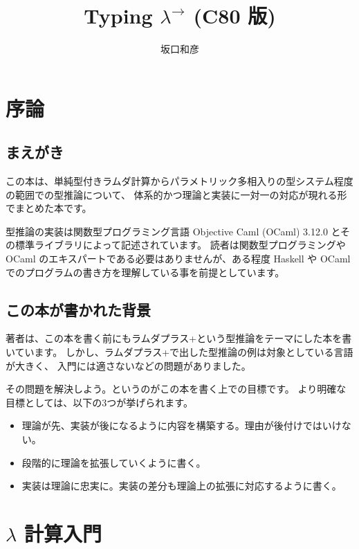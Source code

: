 \documentclass[b5paper]{jsbook}
\title{Typing $\lambda^\to$ (C80 版)}
\author{坂口和彦}
\begin{document}
\maketitle

\tableofcontents
\newpage
{}

\chapter{序論}

\section{まえがき}

この本は、単純型付きラムダ計算からパラメトリック多相入りの型システム程度の範囲での型推論について、
体系的かつ理論と実装に一対一の対応が現れる形でまとめた本です。

型推論の実装は関数型プログラミング言語 Objective Caml (OCaml) 3.12.0
とその標準ライブラリによって記述されています。
読者は関数型プログラミングや OCaml のエキスパートである必要はありませんが、ある程度 Haskell や OCaml
でのプログラムの書き方を理解している事を前提としています。

\section{この本が書かれた背景}

著者は、この本を書く前にもラムダプラス+という型推論をテーマにした本を書いています。
しかし、ラムダプラス+で出した型推論の例は対象としている言語が大きく、
入門には適さないなどの問題がありました。

その問題を解決しよう。というのがこの本を書く上での目標です。
より明確な目標としては、以下の3つが挙げられます。

\begin{itemize}
  \item 理論が先、実装が後になるように内容を構築する。理由が後付けではいけない。
  \item 段階的に理論を拡張していくように書く。
  \item 実装は理論に忠実に。実装の差分も理論上の拡張に対応するように書く。
\end{itemize}

\chapter{$\lambda$ 計算入門}
\end{document}
